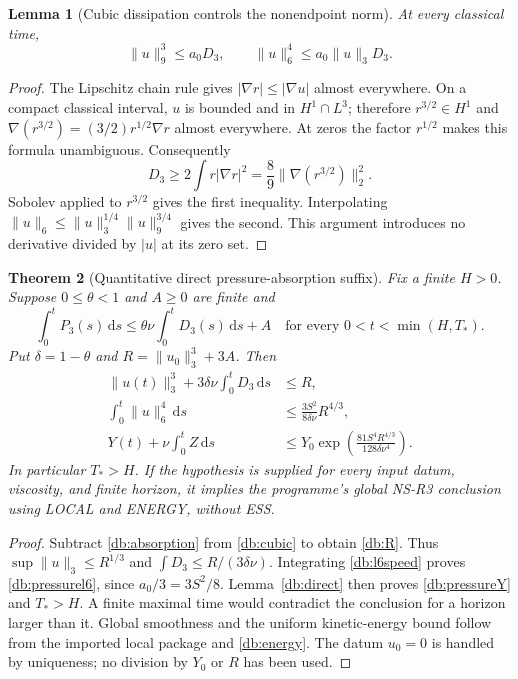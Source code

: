 \documentclass[11pt,a4paper]{article}
\newtheorem{theorem}{Theorem}[section]
\newtheorem{lemma}[theorem]{Lemma}
\theoremstyle{definition}\newtheorem{hypothesis}[theorem]{Hypothesis}
\theoremstyle{remark}\newtheorem{remark}[theorem]{Remark}
\newcommand{\dd}{\,\mathrm d}
\newcommand{\norm}[1]{\lVert #1\rVert}
\numberwithin{equation}{section}
\begin{document}
\begin{lemma}[Cubic dissipation controls the nonendpoint norm]\label{db:speed}
At every classical time,
\begin{equation}\label{db:l6speed}
 \norm u_9^3\le a_0D_3,\qquad
 \norm u_6^4\le a_0\norm u_3D_3.
\end{equation}
\end{lemma}
\begin{proof}
The Lipschitz chain rule gives $|\nabla r|\le|\nabla u|$ almost everywhere.
On a compact classical interval, $u$ is bounded and in $H^1\cap L^3$;
therefore $r^{3/2}\in H^1$ and
$\nabla(r^{3/2})=(3/2)r^{1/2}\nabla r$ almost everywhere. At zeros the
factor $r^{1/2}$ makes this formula unambiguous. Consequently
\[
 D_3\ge2\int r|\nabla r|^2
       =\frac89\norm{\nabla(r^{3/2})}_2^2.
\]
Sobolev applied to $r^{3/2}$ gives the first inequality. Interpolating
$\norm u_6\le\norm u_3^{1/4}\norm u_9^{3/4}$ gives the second. This
argument introduces no derivative divided by $|u|$ at its zero set.
\end{proof}

\begin{theorem}[Quantitative direct pressure-absorption suffix]\label{db:pressure}
Fix a finite $H>0$. Suppose $0\le\theta<1$ and $A\ge0$ are finite and
\begin{equation}\label{db:absorption}
 \int_0^t P_3(s)\dd s\le\theta\nu\int_0^tD_3(s)\dd s+A
 \quad\text{for every }0<t<\min(H,T_*).
\end{equation}
Put $\delta=1-\theta$ and $R=\norm{u_0}_3^3+3A$. Then
\begin{align}
 \norm{u(t)}_3^3+3\delta\nu\int_0^tD_3\dd s&\le R,\label{db:R}\\
 \int_0^t\norm u_6^4\dd s&\le\frac{3S^2}{8\delta\nu}R^{4/3},
 \label{db:pressurel6}\\
 Y(t)+\nu\int_0^tZ\dd s
 &\le Y_0\exp\left(\frac{81S^4R^{4/3}}{128\delta\nu^4}\right).
 \label{db:pressureY}
\end{align}
In particular $T_*>H$. If the hypothesis is supplied for every input datum,
viscosity, and finite horizon, it implies the programme's global NS-R3
conclusion using LOCAL and ENERGY, without ESS.
\end{theorem}
\begin{proof}
Subtract \eqref{db:absorption} from \eqref{db:cubic} to obtain
\eqref{db:R}. Thus $\sup\norm u_3\le R^{1/3}$ and
$\int D_3\le R/(3\delta\nu)$. Integrating \eqref{db:l6speed} proves
\eqref{db:pressurel6}, since $a_0/3=3S^2/8$. Lemma~\ref{db:direct}
then proves \eqref{db:pressureY} and $T_*>H$. A finite maximal time would
contradict the conclusion for a horizon larger than it. Global smoothness and
the uniform kinetic-energy bound follow from the imported local package and
\eqref{db:energy}. The datum $u_0=0$ is handled by uniqueness; no division by
$Y_0$ or $R$ has been used.
\end{proof}
\end{document}
